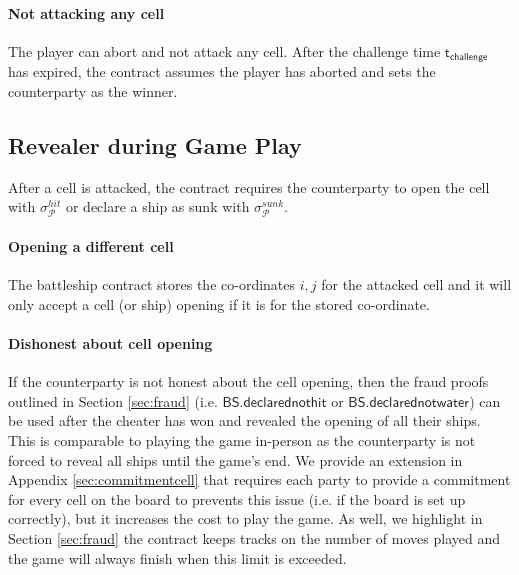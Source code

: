 \documentclass{llncs}
\newcommand{\participant}{\mathcal{P}}
\newcommand{\battleshipdeclarednothit}{\mathsf{BS.declarednothit}}
\newcommand{\battleshipdeclarednotwater}{\mathsf{BS.declarednotwater}}
\newcommand{\timechallenge}{\mathsf{t}_{\mathsf{challenge}}}
\begin{document}
\paragraph{Not attacking any cell} 
The player can abort and not attack any cell. 
After the challenge time $\timechallenge$ has expired, the contract assumes the player has aborted and sets the counterparty as the winner. 

\subsection{Revealer during Game Play} 
After a cell is attacked, the contract requires the counterparty to open the cell with $\sigma^{hit}_{\participant}$ or declare a ship as sunk with  $\sigma^{sunk}_{\participant}$.

\paragraph{Opening a different cell}
The battleship contract stores the co-ordinates $i,j$ for the attacked cell and it will only accept a cell (or ship) opening if it is for the stored co-ordinate. 

\paragraph{Dishonest about cell opening}
If the counterparty is not honest about the cell opening, then the fraud proofs outlined in Section \ref{sec:fraud} (i.e. $\battleshipdeclarednothit$ or $\battleshipdeclarednotwater$) can be used after the cheater has won and revealed the opening of all their ships. 
This is comparable to playing the game in-person as the counterparty is not forced to reveal all ships until the game's end. 
We provide an extension in Appendix \ref{sec:commitmentcell} that requires each party to provide a commitment for every cell on the board to prevents this issue (i.e. if the board is set up correctly), but it increases the cost to play the game. 
As well, we highlight in Section \ref{sec:fraud} the contract keeps tracks on the number of moves played and the game will always finish when this limit is exceeded. 
\end{document}
